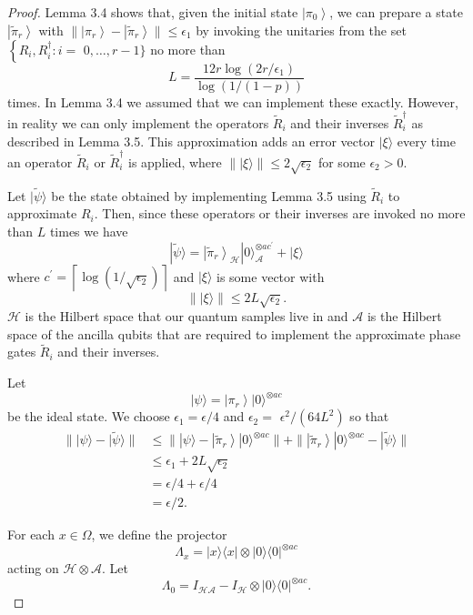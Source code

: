 \begin{proof}
	 Lemma 3.4 shows that, given the initial state $\left|\pi_0\right\rangle$, we can prepare a state $\left|\tilde{\pi}_r\right\rangle$ with $\|\left|\pi_r\right\rangle-\left|\tilde{\pi}_r\right\rangle \| \leq \epsilon_1$ by invoking the unitaries from the set $\left\{R_i, R_i^{\dagger}: i=\right.$ $0, \ldots, r-1\}$ no more than
	$$
	L=\frac{12 r \log \left(2 r / \epsilon_1\right)}{\log (1 /(1-p))}
	$$
	times.
	In Lemma 3.4 we assumed that we can implement these exactly. However, in reality we can only implement the operators $\tilde{R}_i$ and their inverses $\tilde{R}_i^{\dagger}$ as described in Lemma 3.5. This approximation adds an error vector $|\xi\rangle$ every time an operator $\tilde{R}_i$ or $\tilde{R}_i^{\dagger}$ is applied, where $\||\xi\rangle \| \leq 2 \sqrt{\epsilon_2}$ for some $\epsilon_2>0$.
	
	Let $|\tilde{\psi}\rangle$ be the state obtained by implementing Lemma 3.5 using $\tilde{R}_i$ to approximate $R_i$. Then, since these operators or their inverses are invoked no more than $L$ times we have
	$$
	|\tilde{\psi}\rangle=\left|\tilde{\pi}_r\right\rangle_{\mathcal{H}}|0\rangle_{\mathcal{A}}^{\otimes a c^{\prime}}+|\xi\rangle
	$$
	where $c^{\prime}=\left\lceil\log \left(1 / \sqrt{\epsilon_2}\right)\right\rceil$ and $|\xi\rangle$ is some vector with
	$$
	\||\xi\rangle \| \leq 2 L \sqrt{\epsilon_2} .
	$$
	$\mathcal{H}$ is the Hilbert space that our quantum samples live in and $\mathcal{A}$ is the Hilbert space of the ancilla qubits that are required to implement the approximate phase gates $\tilde{R}_i$ and their inverses.
	
	Let
	$$
	|\psi\rangle=\left|\pi_r\right\rangle|0\rangle^{\otimes a c}
	$$
	be the ideal state. We choose $\epsilon_1=\epsilon / 4$ and $\epsilon_2=$ $\epsilon^2 /\left(64 L^2\right)$ so that
	$$
	\begin{aligned}
		\||\psi\rangle-|\tilde{\psi}\rangle \| & \leq \||\psi\rangle-\left|\tilde{\pi}_r\right\rangle|0\rangle^{\otimes a c}\|+\|\left|\tilde{\pi}_r\right\rangle|0\rangle^{\otimes a c}-|\tilde{\psi}\rangle \| \\
		& \leq \epsilon_1+2 L \sqrt{\epsilon_2} \\
		& =\epsilon / 4+\epsilon / 4 \\
		& =\epsilon / 2 .
	\end{aligned}
	$$
	
	For each $x \in \Omega$, we define the projector
	$$
	\Lambda_x=|x\rangle\langle x|\otimes| 0\rangle\langle\left. 0|^{\otimes a c}\right.
	$$
	acting on $\mathcal{H} \otimes \mathcal{A}$. Let
	$$
	\Lambda_0=I_{\mathcal{H A}}-I_{\mathcal{H}} \otimes|0\rangle\langle\left. 0|^{\otimes a c} .\right.
	$$
	

\end{proof}

